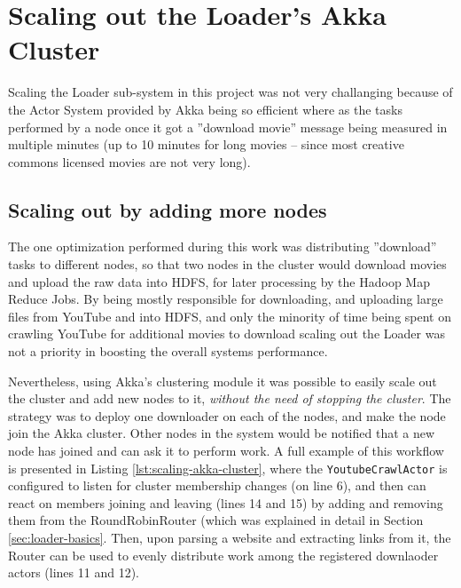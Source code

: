 \section{Scaling out the Loader's Akka Cluster}
\label{sec:scaling-akka}

Scaling the Loader sub-system in this project was not very challanging because of the Actor System provided by Akka being so efficient where as the tasks performed by a node once it got a ''download movie'' message being measured in multiple minutes (up to 10 minutes for long movies -- since most creative commons licensed movies are not very long).

\subsection{Scaling out by adding more nodes}
\label{sec:scaling-akka-out}

The one optimization performed during this work was distributing ''download'' tasks to different nodes, so that two nodes in the cluster would download movies and upload the raw data into HDFS, for later processing by the Hadoop Map Reduce Jobs. By being mostly responsible for downloading, and uploading large files from YouTube and into HDFS, and only the minority of time being spent on crawling YouTube for additional movies to download scaling out the Loader was not a priority in boosting the overall systems performance.

Nevertheless, using Akka's clustering module it was possible to easily scale out the cluster and add new nodes to it, \textit{without the need of stopping the cluster}. The strategy was to deploy one downloader on each of the nodes, and make the node join the Akka cluster. Other nodes in the system would be notified that a new node has joined and can ask it to perform work. A full example of this workflow is presented in Listing \ref{lst:scaling-akka-cluster}, where the \verb|YoutubeCrawlActor| is configured to listen for cluster membership changes (on line 6), and then can react on members joining and leaving (lines 14 and 15) by adding and removing them from the RoundRobinRouter (which was explained in detail in Section \ref{sec:loader-basics}. Then, upon parsing a website and extracting links from it, the Router can be used to evenly distribute work among the registered downlaoder actors (lines 11 and 12).

